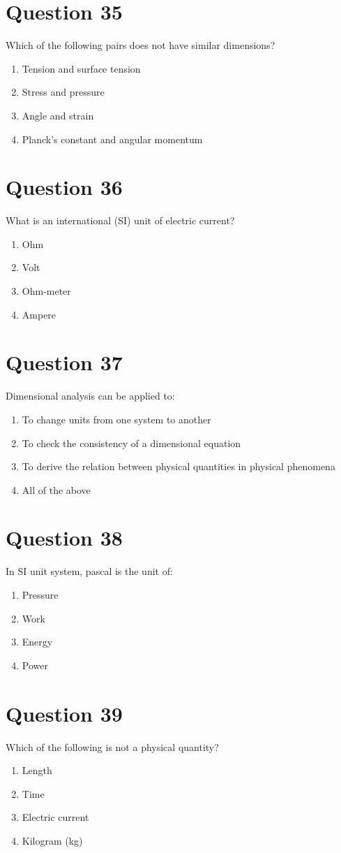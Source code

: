 \documentclass{article}
\begin{document}
\section*{Question 35}
Which of the following pairs does not have similar dimensions?
\begin{enumerate}[label=(\alph*)]
\item Tension and surface tension
\item Stress and pressure
\item Angle and strain
\item Planck's constant and angular momentum
\end{enumerate}
\newpage
\section*{Question 36}
What is an international (SI) unit of electric current?
\begin{enumerate}[label=(\alph*)]
\item Ohm
\item Volt
\item Ohm-meter
\item Ampere
\end{enumerate}
\newpage
\section*{Question 37}
Dimensional analysis can be applied to:
\begin{enumerate}[label=(\alph*)]
\item To change units from one system to another
\item To check the consistency of a dimensional equation
\item To derive the relation between physical quantities in physical phenomena
\item All of the above
\end{enumerate}
\newpage
\section*{Question 38}
In SI unit system, pascal is the unit of:
\begin{enumerate}[label=(\alph*)]
\item Pressure
\item Work
\item Energy
\item Power
\end{enumerate}
\newpage
\section*{Question 39}
Which of the following is not a physical quantity?
\begin{enumerate}[label=(\alph*)]
\item Length
\item Time
\item Electric current
\item Kilogram (kg)
\end{enumerate}
\newpage
\end{document}
